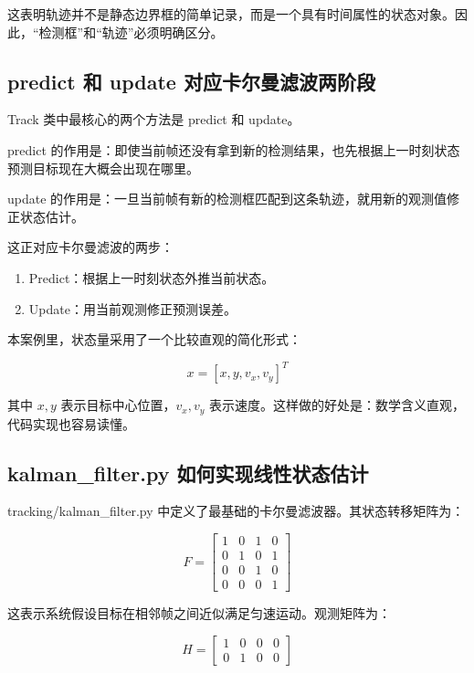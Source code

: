 这表明轨迹并不是静态边界框的简单记录，而是一个具有时间属性的状态对象。因此，``检测框''和``轨迹''必须明确区分。

\subsection{predict 和 update
对应卡尔曼滤波两阶段}\label{src-experiment-case2-h42}

Track 类中最核心的两个方法是 predict 和 update。

predict
的作用是：即使当前帧还没有拿到新的检测结果，也先根据上一时刻状态预测目标现在大概会出现在哪里。

update
的作用是：一旦当前帧有新的检测框匹配到这条轨迹，就用新的观测值修正状态估计。

这正对应卡尔曼滤波的两步：

\begin{enumerate}
\def\labelenumi{\arabic{enumi}.}
\tightlist
\item
  Predict：根据上一时刻状态外推当前状态。
\item
  Update：用当前观测修正预测误差。
\end{enumerate}

本案例里，状态量采用了一个比较直观的简化形式：

\[
x = [x, y, v_x, v_y]^T
\]

其中 \(x, y\) 表示目标中心位置，\(v_x, v_y\)
表示速度。这样做的好处是：数学含义直观，代码实现也容易读懂。

\subsection{kalman\_filter.py
如何实现线性状态估计}\label{src-experiment-case2-h43}

tracking/kalman\_filter.py
中定义了最基础的卡尔曼滤波器。其状态转移矩阵为：

\[
F =
\begin{bmatrix}
1 & 0 & 1 & 0 \\
0 & 1 & 0 & 1 \\
0 & 0 & 1 & 0 \\
0 & 0 & 0 & 1
\end{bmatrix}
\]

这表示系统假设目标在相邻帧之间近似满足匀速运动。观测矩阵为：

\[
H =
\begin{bmatrix}
1 & 0 & 0 & 0 \\
0 & 1 & 0 & 0
\end{bmatrix}
\]

